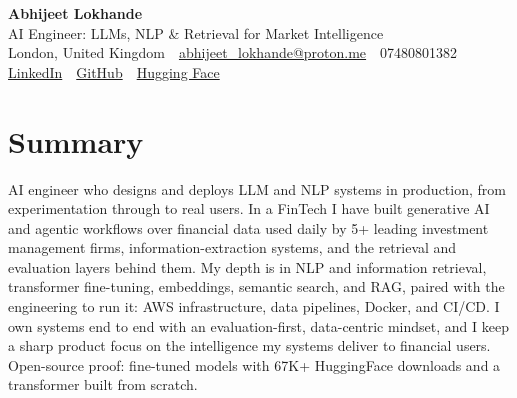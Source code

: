\documentclass[10pt,a4paper]{article}
\newcommand{\sep}{\,\textcolor{accent!60}{\textbar}\,}
\begin{document}
\begin{center}
  {\fontsize{24}{26}\selectfont\bfseries Abhijeet Lokhande}\\[3pt]
  {\color{accent}\large AI Engineer: LLMs, NLP \& Retrieval for Market Intelligence}\\[5pt]
  {\small
    London, United Kingdom \sep
    \href{mailto:abhijeet_lokhande@proton.me}{abhijeet\_lokhande@proton.me} \sep
    07480801382 \\[2pt]
    \href{https://www.linkedin.com/in/ablds/}{LinkedIn} \sep
    \href{https://github.com/abhijeetscode}{GitHub} \sep
    \href{https://huggingface.co/ab-ai}{Hugging Face}
  }
\end{center}
\vspace{2pt}

\section{Summary}
AI engineer who designs and deploys LLM and NLP systems in production, from experimentation through to real users. In a FinTech I have built generative AI and agentic workflows over financial data used daily by 5+ leading investment management firms, information-extraction systems, and the retrieval and evaluation layers behind them. My depth is in NLP and information retrieval, transformer fine-tuning, embeddings, semantic search, and RAG, paired with the engineering to run it: AWS infrastructure, data pipelines, Docker, and CI/CD. I own systems end to end with an evaluation-first, data-centric mindset, and I keep a sharp product focus on the intelligence my systems deliver to financial users. Open-source proof: fine-tuned models with 67K+ HuggingFace downloads and a transformer built from scratch.

\end{document}

